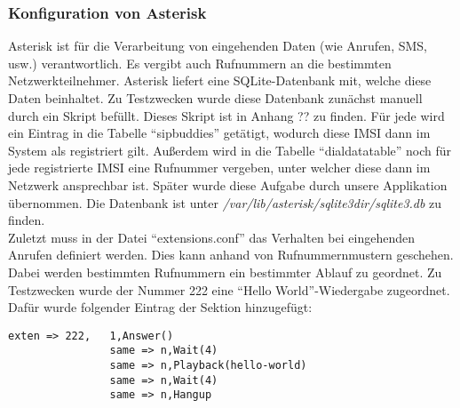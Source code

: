 \subsubsection{Konfiguration von Asterisk}
Asterisk ist für die Verarbeitung von eingehenden Daten (wie Anrufen, SMS, usw.) verantwortlich. Es vergibt auch Rufnummern an die bestimmten Netzwerkteilnehmer. Asterisk liefert eine SQLite-Datenbank mit, welche diese Daten beinhaltet. Zu Testzwecken wurde diese Datenbank zunächst manuell durch ein Skript befüllt. Dieses Skript ist in Anhang ?? zu finden. Für jede \IMSI wird ein Eintrag in die Tabelle ``sip\textunderscore buddies'' getätigt, wodurch diese IMSI dann im System als registriert gilt. Außerdem wird in die Tabelle ``dialdata\textunderscore table'' noch für jede registrierte IMSI eine Rufnummer vergeben, unter welcher diese dann im Netzwerk ansprechbar ist. Später wurde diese Aufgabe durch unsere Applikation übernommen. Die Datenbank ist unter \textit{/var/lib/asterisk/sqlite3dir/sqlite3.db} zu finden. \\
Zuletzt muss in der Datei ``extensions.conf'' das Verhalten bei eingehenden Anrufen definiert werden. Dies kann anhand von Rufnummernmustern geschehen. Dabei werden bestimmten Rufnummern ein bestimmter Ablauf zu geordnet. Zu Testzwecken wurde der Nummer 222 eine ``Hello World''-Wiedergabe zugeordnet. Dafür wurde folgender Eintrag der \inlinecode{[phones]} Sektion hinzugefügt:
\begin{lstlisting}
exten => 222,   1,Answer()
                same => n,Wait(4)
                same => n,Playback(hello-world)
                same => n,Wait(4)
                same => n,Hangup
\end{lstlisting}

